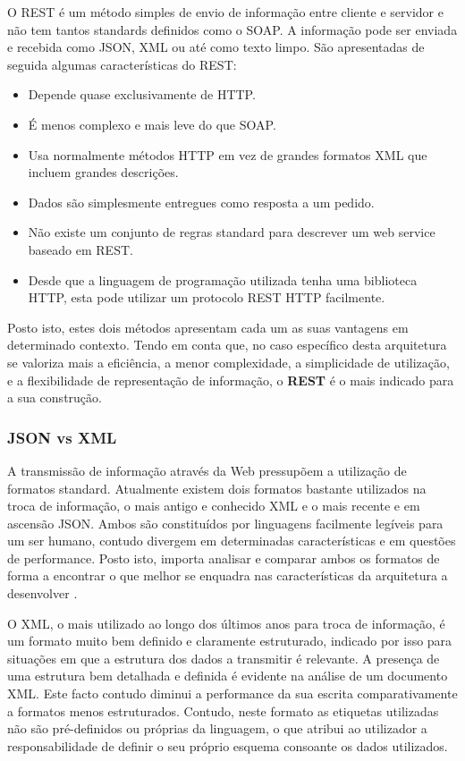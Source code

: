 O REST é um método simples de envio de informação entre cliente e servidor e não tem tantos standards definidos como o SOAP. A informação pode ser enviada e recebida como JSON, XML ou até como texto limpo. São apresentadas de seguida algumas características do REST:
\begin{itemize}
	\item Depende quase exclusivamente de HTTP.
	\item É menos complexo e mais leve do que SOAP.
	\item Usa normalmente métodos HTTP em vez de grandes formatos XML que incluem grandes descrições.
	\item Dados são simplesmente entregues como resposta a um pedido.
	\item Não existe um conjunto de regras standard para descrever um web service baseado em REST.
	\item Desde que a linguagem de programação utilizada tenha uma biblioteca HTTP, esta pode utilizar um protocolo REST HTTP facilmente.
\end{itemize}

Posto isto, estes dois métodos apresentam cada um as suas vantagens em determinado contexto. Tendo em conta que, no caso específico desta arquitetura se valoriza mais a eficiência, a menor complexidade, a simplicidade de utilização, e a flexibilidade de representação de informação, o \textbf{REST} é o mais indicado para a sua construção. 

\subsubsection{JSON vs XML}

A transmissão de informação através da Web pressupõem a utilização de formatos standard. Atualmente existem dois formatos bastante utilizados na troca de informação, o mais antigo e conhecido XML e o mais recente e em ascensão JSON. Ambos são constituídos por linguagens facilmente legíveis para um ser humano, contudo divergem em determinadas características e em questões de performance. Posto isto, importa analisar e comparar ambos os formatos de forma a encontrar o que melhor se enquadra nas características da arquitetura a desenvolver \cite{nurseitov2009comparison}.

O XML, o mais utilizado ao longo dos últimos anos para troca de informação, é um formato muito bem definido e claramente estruturado, indicado por isso para situações em que a estrutura dos dados a transmitir é relevante. A presença de uma estrutura bem detalhada e definida é evidente na análise de um documento XML. Este facto contudo diminui a performance da sua escrita comparativamente a formatos menos estruturados. Contudo, neste formato as etiquetas utilizadas não são pré-definidos ou próprias da linguagem, o que atribui ao utilizador a responsabilidade de definir o seu próprio esquema consoante os dados utilizados.

